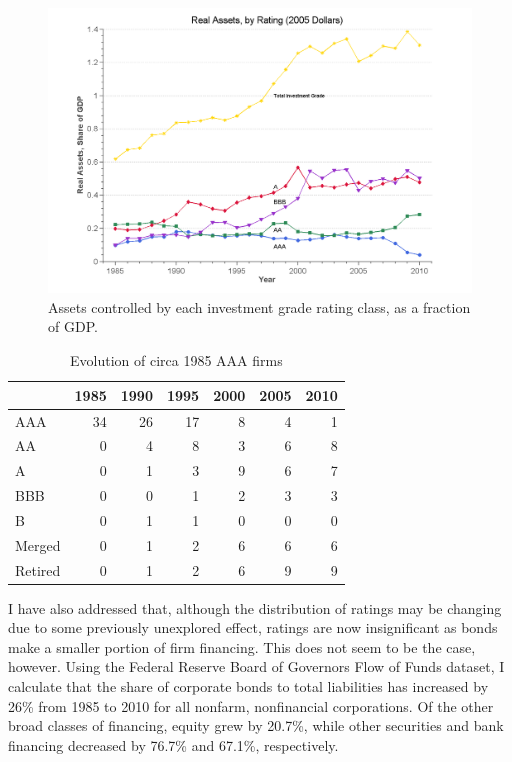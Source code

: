 \documentclass[notitlepage]{article}
\begin{document}
\begin{figure}[ht]
\centering
	\includegraphics[width=\textwidth]{assets.png}
	\caption{Assets controlled by each investment grade rating class, as a fraction of GDP.}
	\label{fig:assets}
\end{figure}

\begin{table}\centering
\begin{tabular}{l *{6}r}
\toprule
  	& 1985  & 1990  & 1995  & 2000  & 2005  & 2010\\ \midrule
AAA  	& 34  	& 26  	& 17  	& 8  	& 4  	& 1\\
AA  	& 0  	& 4  	& 8  	& 3  	& 6  	& 8\\
A  	& 0  	& 1  	& 3  	& 9  	& 6  	& 7\\
BBB  	& 0  	& 0  	& 1  	& 2  	& 3  	& 3\\
B  	& 0  	& 1  	& 1  	& 0  	& 0  	& 0\\
Merged 	& 0  	& 1  	& 2  	& 6  	& 6  	& 6\\
Retired	& 0  	& 1  	& 2  	& 6  	& 9  	& 9\\ 
\bottomrule
\end{tabular}
\caption{Evolution of circa 1985 AAA firms}
\label{tab:mrg}
\end{table}
I have also addressed that, although the distribution of ratings may be changing due to some previously unexplored effect, ratings are now insignificant as bonds make a smaller portion of firm financing. This does not seem to be the case, however. Using the Federal Reserve Board of Governors Flow of Funds dataset, I calculate that the share of corporate bonds to total liabilities has increased by 26\% from 1985 to 2010 for all nonfarm, nonfinancial corporations. Of the other broad classes of financing, equity grew by 20.7\%, while other securities and bank financing decreased by 76.7\% and 67.1\%, respectively.
\end{document}
